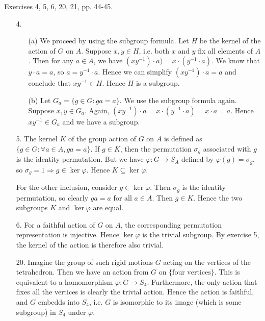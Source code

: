 \documentclass[12pt]{article}
\theoremstyle{remark}
\theoremstyle{named}
\renewcommand{\implies}{\Rightarrow}
\begin{document}
Exercises 4, 5, 6, 20, 21, pp. 44-45.

\begin{enumerate}
    \item [4.] 
    \begin{enumerate}
        \item [(a)] We proceed by using the subgroup formula. Let \(H\) be the kernel of the action of \(G\) on \(A\). Suppose \(x, y \in H\), i.e. both \(x\) and \(y\) fix all elements of \(A\). Then for any \(a \in A\), we have \((xy^{-1}) \cdot a) = x \cdot (y^{-1} \cdot a)\). We know that \(y \cdot a = a\), so \(a = y^{-1} \cdot a\). Hence we can simplify \((xy^{-1})\cdot a = a\) and conclude that \(xy^{-1} \in H\). Hence \(H\) is a subgroup.
        \item [(b)] Let \(G_a = \{g \in G : ga = a\}\). We use the subgroup formula again. Suppose \(x, y \in G_a\). Again, \((xy^{-1}) \cdot a = x \cdot (y^{-1} \cdot a) = x \cdot a = a\). Hence \(xy^{-1} \in G_a\) and we have a subgroup. 
    \end{enumerate}

    \item [5.] The kernel \(K\) of the group action of \(G\) on \(A\) is defined as \(\{g \in G : \forall a \in A, ga = a\}\). If \(g \in K\), then the permutation \(\sigma_g\) associated with \(g\) is the identity permutation. But we have \(\varphi : G \to S_A\) defined by \(\varphi(g) = \sigma_g\), so \(\sigma_g = 1 \implies g \in \ker \varphi\). Hence \(K \subseteq \ker \varphi\).
    
    For the other inclusion, consider \(g \in \ker \varphi\). Then \(\sigma_g\) is the identity permutation, so clearly \(ga = a\) for all \(a \in A\). Then \(g \in K\). Hence the two subgroups \(K\) and \(\ker \varphi\) are equal.

    \item [6.] For a faithful action of \(G\) on \(A\), the corresponding permutation representation is injective. Hence \(\ker \varphi\) is the trivial subgroup. By exercise 5, the kernel of the action is therefore also trivial.
    
    \item [20.] Imagine the group of such rigid motions \(G\) acting on the vertices of the tetrahedron. Then we have an action from \(G\) on \(\{\text{four vertices}\}\). This is equivalent to a homomorphism \(\varphi : G \to S_4\). Furthermore, the only action that fixes all the vertices is clearly the trivial action. Hence the action is faithful, and \(G\) embedds into \(S_4\), i.e. \(G\) is isomorphic to its image (which is some subgroup) in \(S_4\) under \(\varphi\).
    

\end{enumerate}
\end{document}
